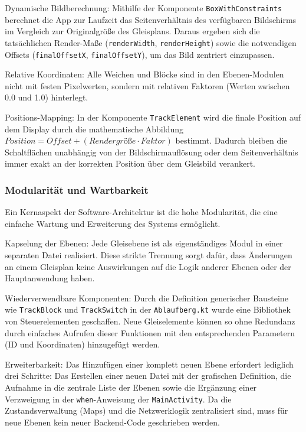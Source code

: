 \documentclass{article}
\begin{document}
Dynamische Bildberechnung:
Mithilfe der Komponente \texttt{BoxWithConstraints} berechnet die App zur Laufzeit das Seitenverhältnis des verfügbaren Bildschirms im Vergleich zur Originalgröße des Gleisplans.
Daraus ergeben sich die tatsächlichen Render-Maße (\texttt{renderWidth}, \texttt{renderHeight}) sowie die notwendigen Offsets  (\texttt{final\-OffsetX}, \texttt{finalOffsetY}), um das Bild zentriert einzupassen.

Relative Koordinaten:
Alle Weichen und Blöcke sind in den Ebenen-Modulen nicht mit festen Pixelwerten, sondern mit relativen Faktoren (Werten zwischen 0.0 und 1.0) hinterlegt.

Positions-Mapping:
In der Komponente \texttt{TrackElement} wird die finale Position auf dem Display durch die mathematische Abbildung $Position = Offset + (Rendergr\text{ö\ss}e \cdot Faktor)$ bestimmt.
Dadurch bleiben die Schaltflächen unabhängig von der Bildschirmauflösung oder dem Seitenverhältnis immer exakt an der korrekten Position über dem Gleisbild verankert.


\subsubsection{Modularität und Wartbarkeit}
Ein Kernaspekt der Software-Architektur ist die hohe Modularität, die eine einfache Wartung und Erweiterung des Systems ermöglicht.

Kapselung der Ebenen:
Jede Gleisebene ist als eigenständiges Modul in einer separaten Datei realisiert.
Diese strikte Trennung sorgt dafür, dass Änderungen an einem Gleisplan keine Auswirkungen auf die Logik anderer Ebenen oder der Hauptanwendung haben.

Wiederverwendbare Komponenten:
Durch die Definition generischer Bausteine wie \texttt{TrackBlock} und \texttt{TrackSwitch} in der \texttt{Ablaufberg.kt} wurde eine Bibliothek von Steuerelementen geschaffen.
Neue Gleiselemente können so ohne Redundanz durch einfaches Aufrufen dieser Funktionen mit den entsprechenden Parametern (ID und Koordinaten) hinzugefügt werden.

Erweiterbarkeit:
Das Hinzufügen einer komplett neuen Ebene erfordert lediglich drei Schritte:
Das Erstellen einer neuen Datei mit der grafischen Definition, die Aufnahme in die zentrale Liste der Ebenen sowie die Ergänzung einer Verzweigung in der \texttt{when}-Anweisung der \texttt{MainActivity}.
Da die Zustandsverwaltung (Maps) und die Netzwerklogik zentralisiert sind, muss für neue Ebenen kein neuer Backend-Code geschrieben werden.
\end{document}
